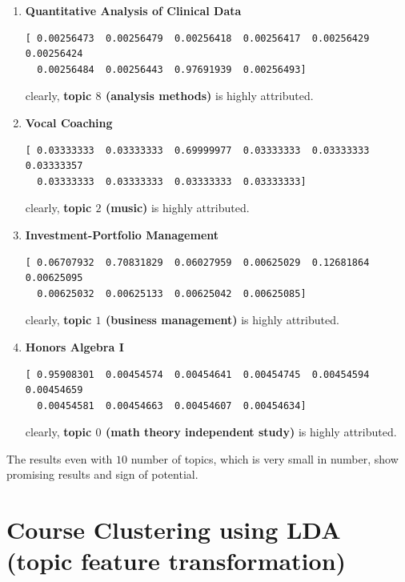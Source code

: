 \documentclass[twoside]{article}
\begin{document}
\begin{enumerate}
\item \textbf{Quantitative Analysis of Clinical Data}\\
\begin{verbatim}
[ 0.00256473  0.00256479  0.00256418  0.00256417  0.00256429  0.00256424
  0.00256484  0.00256443  0.97691939  0.00256493]
\end{verbatim}
clearly, \textbf{topic $8$ (analysis methods)} is highly attributed.\\

\item \textbf{Vocal Coaching}\\
\begin{verbatim}
[ 0.03333333  0.03333333  0.69999977  0.03333333  0.03333333  0.03333357
  0.03333333  0.03333333  0.03333333  0.03333333]
\end{verbatim}
clearly, \textbf{topic $2$ (music)} is highly attributed.\\

\item \textbf{Investment-Portfolio Management}\\
\begin{verbatim}
[ 0.06707932  0.70831829  0.06027959  0.00625029  0.12681864  0.00625095
  0.00625032  0.00625133  0.00625042  0.00625085]
\end{verbatim}
clearly, \textbf{topic $1$ (business management)} is highly attributed.\\

\item \textbf{Honors Algebra I}\\
\begin{verbatim}
[ 0.95908301  0.00454574  0.00454641  0.00454745  0.00454594  0.00454659
  0.00454581  0.00454663  0.00454607  0.00454634]
\end{verbatim}
clearly, \textbf{topic $0$ (math theory independent study)} is highly attributed.\\
\end{enumerate}


The results even with $10$ number of topics, which is very small in number, show promising results and sign of potential.

\vfill
\pagebreak

\section{Course Clustering using LDA (topic feature transformation)}
\end{document}
